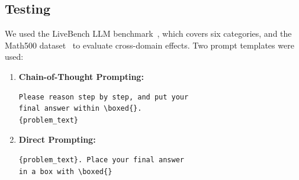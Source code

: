 \documentclass[10.5pt]{article}
\begin{document}
\subsection{Testing}
We used the LiveBench LLM benchmark~\cite{livebench}, which covers six categories, and the Math500 dataset~\cite{lightman2023lets} to evaluate cross-domain effects. Two prompt templates were used:
\begin{enumerate}
    \item \textbf{Chain-of-Thought Prompting:}
    \begin{verbatim}
Please reason step by step, and put your 
final answer within \boxed{}.
{problem_text}
    \end{verbatim}
    \item \textbf{Direct Prompting:}
    \begin{verbatim}
{problem_text}. Place your final answer 
in a box with \boxed{}
    \end{verbatim}
\end{enumerate}
\end{document}
